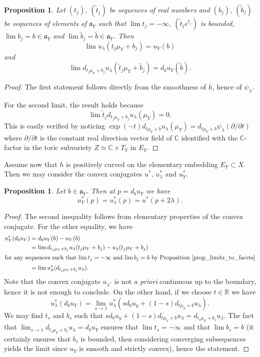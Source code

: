 \documentclass{amsart}
\newtheorem{prop}[thm]{Proposition}
\theoremstyle{definition}
\begin{document}
\begin{prop}
\label{prop_limits_to_facets}
Let $(t_j)$, $(\tilde{t}_j)$ be sequences of real numbers 
and $(b_j)$, $(\tilde{b}_j)$ be sequences of elements of $\mathfrak{a}_Y$ 
such that $\lim t_j=-\infty$, $(\tilde{t}_je^{t_j})$ is bounded, 
$\lim b_j=b\in \mathfrak{a}_Y$ and 
$\lim \tilde{b}_j=\tilde{b}\in \mathfrak{a}_Y$.
Then 
\[
\lim u_{\lambda}(t_j \mu_Y+b_j)=u_Y(b)
\] 
and 
\[ 
\lim d_{t_j \mu_Y+b_j}u_{\lambda}(\tilde{t}_j \mu_Y+\tilde{b}_j)=
d_bu_Y(\tilde{b}).
\]
\end{prop}

\begin{proof}
The first statement follows directly from the smoothness of $h$, 
hence of $\psi_{\lambda}$.

For the second limit, the result holds because 
\[
\lim \tilde{t}_j d_{t_j \mu_Y+b_j}u_{\lambda}(\mu_Y)=0.
\]
This is easily verified by noticing 
$\exp(-t)d_{t \mu_Y+b}u_{\lambda}(\mu_Y)=
d_{t \mu_Y+b}\psi_{\lambda}(\partial/\partial t)$
where $\partial/\partial t$ is the constant real direction vector field 
of $\mathbb{C}$ identified with the $\mathbb{C}$-factor in the toric 
subvariety $Z\simeq \mathbb{C} \times T_Y$ in $E_Y$.
\end{proof}

Assume now that $h$ is positively curved on the elementary embedding $E_Y\subset X$. 
Then we may consider the convex conjugates $u^*$, $u_{\lambda}^*$ and $u_Y^*$. 

\begin{prop}
\label{prop_legendre_facet}
Let $b\in \mathfrak{a}_Y$. Then at $p=d_bu_Y$ we have  
\[
u^*_Y(p)=u_{\lambda}^*(p)=u^*(p+2\lambda).
\]
\end{prop}

\begin{proof}
The second inequality follows from elementary properties of 
the convex conjugate.
For the other equality, we have 
\begin{align*}
u_Y^*(d_bu_Y) & = d_bu_Y(b)-u_Y(b) \\
& = \lim d_{t_j \mu_Y+b_j}u_{\lambda}(t_j \mu_Y+b_j)-u_{\lambda}(t_j \mu_Y+b_j) \\
\intertext{for any sequences such that $\lim t_j=-\infty$ and $\lim b_j=b$ by Proposition~\ref{prop_limits_to_facets}}
& =\lim u_{\lambda}^*(d_{t_j \mu_Y+b_j}u_{\lambda}).  
\end{align*}
Note that the convex conjugate $u_{\lambda^*}$ is not \emph{a priori}
continuous up to the boundary, hence it is not enough to conclude. 
On the other hand, if we choose $t\in \mathbb{R}$ we have 
\[
u_{\lambda}^*(d_bu_Y) = \lim_{s\rightarrow 1}
u_{\lambda}^*(sd_bu_y+(1-s)d_{t\mu_Y+b}u_{\lambda}).
\]
We may find $t_s$ and $b_s$ such that 
$sd_bu_y+(1-s)d_{t\mu_Y+b}u_{\lambda}=d_{t_s\mu_Y+b_s}u_{\lambda}$.
The fact that $\lim_{s\rightarrow 1}d_{t_s\mu_Y+b_s}u_{\lambda}=d_bu_Y$
ensures that $\lim t_s=-\infty$ and that $\lim b_s=b$ (it certainly 
ensures that $b_s$ is bounded, then considering converging subsequences 
yields the limit since $u_Y$ is smooth and strictly convex), 
hence the statement.
\end{proof}
 
\end{document}
